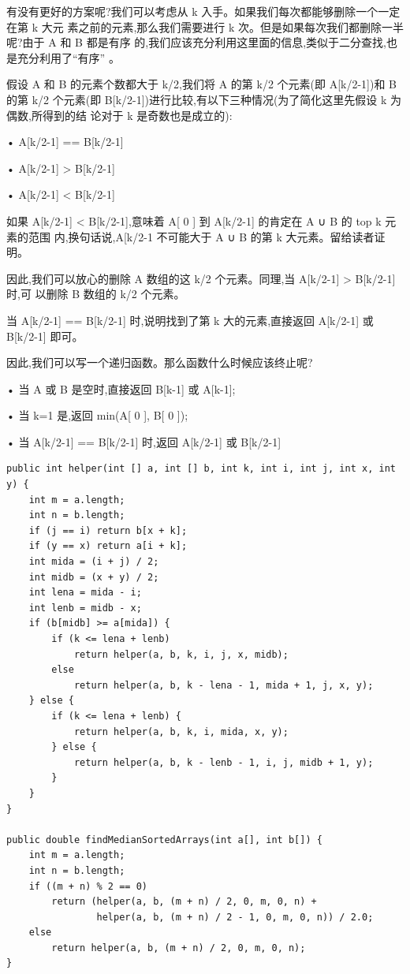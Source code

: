 \documentclass[12pt]{book}
\begin{document}
有没有更好的方案呢?我们可以考虑从 k 入手。如果我们每次都能够删除一个一定在第 k 大元
素之前的元素,那么我们需要进行 k 次。但是如果每次我们都删除一半呢?由于 A 和 B 都是有序
的,我们应该充分利用这里面的信息,类似于二分查找,也是充分利用了“有序”
。

假设 A 和 B 的元素个数都大于 k/2,我们将 A 的第 k/2 个元素(即 A[k/2-1])和 B 的第 k/2
个元素(即 B[k/2-1])进行比较,有以下三种情况(为了简化这里先假设 k 为偶数,所得到的结
论对于 k 是奇数也是成立的):

• A[k/2-1] == B[k/2-1]

• A[k/2-1] > B[k/2-1]

• A[k/2-1] < B[k/2-1]

如果 A[k/2-1] < B[k/2-1],意味着 A[ 0 ] 到 A[k/2-1] 的肯定在 A ∪ B 的 top k 元素的范围
内,换句话说,A[k/2-1 不可能大于 A ∪ B 的第 k 大元素。留给读者证明。

因此,我们可以放心的删除 A 数组的这 k/2 个元素。同理,当 A[k/2-1] > B[k/2-1] 时,可
以删除 B 数组的 k/2 个元素。

当 A[k/2-1] == B[k/2-1] 时,说明找到了第 k 大的元素,直接返回 A[k/2-1] 或 B[k/2-1]
即可。

因此,我们可以写一个递归函数。那么函数什么时候应该终止呢?

• 当 A 或 B 是空时,直接返回 B[k-1] 或 A[k-1];


• 当 k=1 是,返回 min(A[ 0 ], B[ 0 ]);

• 当 A[k/2-1] == B[k/2-1] 时,返回 A[k/2-1] 或 B[k/2-1]

\lstset{language=java,label= ,caption= ,numbers=none}
\begin{lstlisting}
public int helper(int [] a, int [] b, int k, int i, int j, int x, int y) {
    int m = a.length;
    int n = b.length;
    if (j == i) return b[x + k];
    if (y == x) return a[i + k];
    int mida = (i + j) / 2;
    int midb = (x + y) / 2;
    int lena = mida - i;
    int lenb = midb - x;
    if (b[midb] >= a[mida]) {
        if (k <= lena + lenb) 
            return helper(a, b, k, i, j, x, midb);
        else
            return helper(a, b, k - lena - 1, mida + 1, j, x, y);
    } else {
        if (k <= lena + lenb) {
            return helper(a, b, k, i, mida, x, y);
        } else {
            return helper(a, b, k - lenb - 1, i, j, midb + 1, y);
        }
    }
}
        
public double findMedianSortedArrays(int a[], int b[]) {
    int m = a.length;
    int n = b.length;
    if ((m + n) % 2 == 0)
        return (helper(a, b, (m + n) / 2, 0, m, 0, n) +
                helper(a, b, (m + n) / 2 - 1, 0, m, 0, n)) / 2.0;
    else
        return helper(a, b, (m + n) / 2, 0, m, 0, n);
}
\end{lstlisting}
\end{document}
